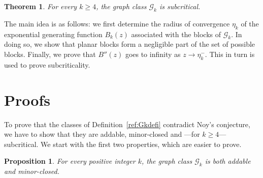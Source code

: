 \documentclass[a4paper]{article}
\newcommand{\G}{\mathcal{G}}
\newtheorem{prop}[lemma]{Proposition}
\newtheorem{theorem}[lemma]{Theorem}
\theoremstyle{remark}
\begin{document}
\begin{theorem}\label{thm:main}
For every $k \geq 4$, the graph class $\G_k$ is subcritical.
\end{theorem}

The main idea is as follows: we first determine the radius of convergence $\eta_k$ of the exponential generating function $B_k(z)$ associated with the blocks of $\G_k$. In doing so, we show that planar blocks form a negligible part of the set of possible blocks. Finally, we prove that $B''(z)$ goes to infinity as $z \to \eta_k^-$. This in turn is used to prove subcriticality.


\section{Proofs}

To prove that the classes of Definition~\ref{ref:Gkdefi} contradict Noy's conjecture, we have to show that they are addable, minor-closed and ---for $k\geq 4$--- subcritical. We start with the first two properties, which are easier to prove.

\begin{prop}\label{prop_add_mc}
For every positive integer $k$, the graph class $\G_k$ is both addable and minor-closed.
\end{prop}
 
\end{document}
